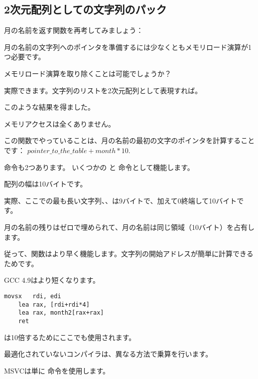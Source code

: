 \subsection{2次元配列としての文字列のパック}

月の名前を返す関数を再考してみましょう：

月の名前の文字列へのポインタを準備するには少なくともメモリロード演算が1つ必要です。

メモリロード演算を取り除くことは可能でしょうか？

実際できます。文字列のリストを2次元配列として表現すれば。



このような結果を得ました。



メモリアクセスは全くありません。

この関数でやっていることは、月の名前の最初の文字のポインタを計算することです：
$pointer\_to\_the\_table + month * 10$.

\LEA 命令も2つあります。 いくつかの \MUL と \MOV 命令として機能します。

配列の幅は10バイトです。

実際、ここでの最も長い文字列、、は9バイトで、加えて0終端して10バイトです。

月の名前の残りはゼロで埋められて、月の名前は同じ領域（10バイト）を占有します。

従って、関数はより早く機能します。文字列の開始アドレスが簡単に計算できるためです。

\Optimizing GCC 4.9はより短くなります。

\begin{lstlisting}[caption=\Optimizing GCC 4.9 x64,style=customasmx86]
	movsx	rdi, edi
	lea	rax, [rdi+rdi*4]
	lea	rax, month2[rax+rax]
	ret
\end{lstlisting}

\LEA は10倍するためにここでも使用されます。

最適化されていないコンパイラは、異なる方法で乗算を行います。



\NonOptimizing MSVCは単に \IMUL 命令を使用します。

